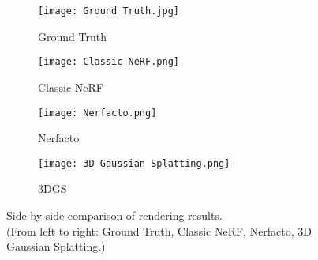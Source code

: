 \documentclass[11pt]{article}
\begin{document}
\begin{figure}[h!]
    \centering
    
    \begin{subfigure}[b]{0.24\linewidth}
        \texttt{[image: Ground Truth.jpg]} %
        \caption{Ground Truth}
        \label{fig:ground_truth}
    \end{subfigure}
    \hfill %
    \begin{subfigure}[b]{0.24\linewidth}
        \texttt{[image: Classic NeRF.png]} %
        \caption{Classic NeRF}
        \label{fig:classic_nerf}
    \end{subfigure}
    \hfill %
    \begin{subfigure}[b]{0.24\linewidth}
        \texttt{[image: Nerfacto.png]} %
        \caption{Nerfacto}
        \label{fig:nerfacto}
    \end{subfigure}
    \hfill %
    \begin{subfigure}[b]{0.24\linewidth}
        \texttt{[image: 3D Gaussian Splatting.png]} %
        \caption{3DGS}
        \label{fig:3d_gaussian}
    \end{subfigure}

    \caption{\centering Side-by-side comparison of rendering results. \\ (From left to right: Ground Truth, Classic NeRF, Nerfacto, 3D Gaussian Splatting.)}
    \label{fig:side_by_side}
\end{figure}
\end{document}
